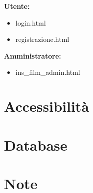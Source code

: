 \documentclass[a4paper]{article}
\begin{document}
\noindent \textbf{Utente:}
\begin{itemize}
    \item login.html
    \item registrazione.html
\end{itemize}
\textbf{Amministratore:}
\begin{itemize}
    \item ins\_film\_admin.html
\end{itemize}



\section{Accessibilit\`a}
\section{Database}
\section{Note}
\end{document}
